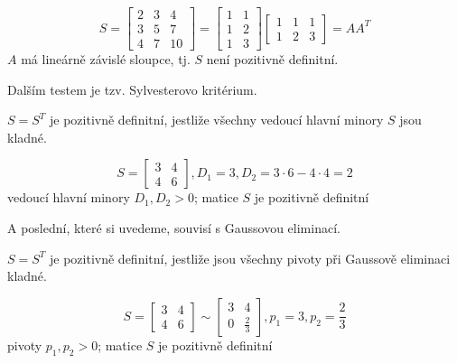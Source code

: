 \begin{pr}
    $$
        S = 
        \begin{bmatrix}
            2 & 3 & 4 \\
            3 & 5 & 7 \\
            4 & 7 & 10
        \end{bmatrix} =
        \begin{bmatrix}
            1 & 1 \\
            1 & 2 \\
            1 & 3
        \end{bmatrix}
        \begin{bmatrix}
            1 & 1 & 1 \\
            1 & 2 & 3
        \end{bmatrix} =
        AA^T
    $$
    $A$ má lineárně závislé sloupce, tj. $S$ není pozitivně definitní.
\end{pr}

Dalším testem je tzv. Sylvesterovo kritérium.

\begin{vt2}
    $S = S^T$ je pozitivně definitní, jestliže všechny vedoucí hlavní minory $S$ jsou kladné.
\end{vt2}

\begin{pr}
    $$  S =
        \begin{bmatrix}
            3 & 4 \\
            4 & 6
        \end{bmatrix},
        D_1 = 3,
        D_2 = 3 \cdot 6 - 4 \cdot 4 = 2 
    $$
    vedoucí hlavní minory $D_1, D_2 > 0$; matice $S$ je pozitivně definitní 
\end{pr}

A poslední, které si uvedeme, souvisí s Gaussovou eliminací.

\begin{vt2}
    $S = S^T$ je pozitivně definitní, jestliže jsou všechny pivoty při Gaussově eliminaci kladné.
\end{vt2}

\begin{pr}
    $$  S =
        \begin{bmatrix}
            3 & 4 \\
            4 & 6
        \end{bmatrix}
        \sim
        \begin{bmatrix}
            3 & 4 \\
            0 & \frac{2}{3}
        \end{bmatrix},
        p_1 = 3, p_2 = \frac{2}{3} 
    $$
    pivoty $p_1, p_2 > 0$; matice $S$ je pozitivně definitní
\end{pr}

